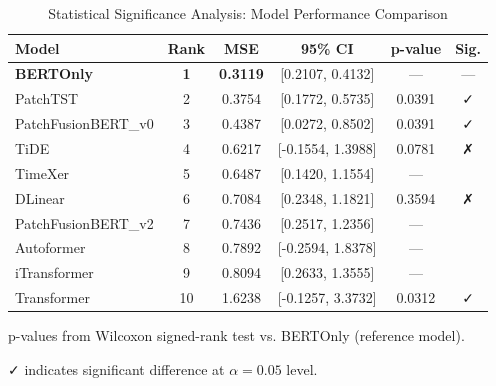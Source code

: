 \begin{table}[t]
\centering
\caption{Statistical Significance Analysis: Model Performance Comparison}
\label{tab:statistical_significance}
\begin{tabular}{lccccc}
\toprule
\textbf{Model} & \textbf{Rank} & \textbf{MSE} & \textbf{95\% CI} & \textbf{p-value} & \textbf{Sig.} \\
\midrule
\textbf{BERTOnly} & \textbf{1} & \textbf{0.3119} & [0.2107, 0.4132] & --- & --- \\
PatchTST & 2 & 0.3754 & [0.1772, 0.5735] & 0.0391 & ✓ \\
PatchFusionBERT\_v0 & 3 & 0.4387 & [0.0272, 0.8502] & 0.0391 & ✓ \\
TiDE & 4 & 0.6217 & [-0.1554, 1.3988] & 0.0781 & ✗ \\
TimeXer & 5 & 0.6487 & [0.1420, 1.1554] & --- &  \\
DLinear & 6 & 0.7084 & [0.2348, 1.1821] & 0.3594 & ✗ \\
PatchFusionBERT\_v2 & 7 & 0.7436 & [0.2517, 1.2356] & --- &  \\
Autoformer & 8 & 0.7892 & [-0.2594, 1.8378] & --- &  \\
iTransformer & 9 & 0.8094 & [0.2633, 1.3555] & --- &  \\
Transformer & 10 & 1.6238 & [-0.1257, 3.3732] & 0.0312 & ✓ \\
\bottomrule
\end{tabular}
\begin{tablenotes}
\small
\item p-values from Wilcoxon signed-rank test vs. BERTOnly (reference model).
\item ✓ indicates significant difference at $\alpha = 0.05$ level.
\end{tablenotes}
\end{table}
